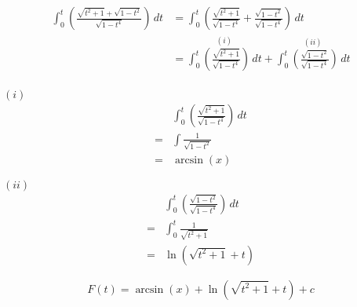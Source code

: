 \documentclass{article}
\begin{document}
\begin{enumerate}[a)]
  \begin{align*}
    \int_0^t \left( \frac{\sqrt{t^2 + 1} + \sqrt{1 - t^2}}{\sqrt{1 - t^4}}\right) \,dt
    &= \int_0^t \left( \frac{\sqrt{t^2 + 1}}{\sqrt{1 - t^4}} + \frac{\sqrt{1 - t^2}}{\sqrt{1 - t^4}}\right) \,dt \\
    &= \overset{(i)}{\int_0^t \left( \frac{\sqrt{t^2 + 1}}{\sqrt{1 - t^4}}\right) \,dt} +
       \overset{(ii)}{\int_0^t \left(\frac{\sqrt{1 - t^2}}{\sqrt{1 - t^4}}\right) \,dt} \\
  \end{align*}
  \begin{minipage}[t]{.45\textwidth}
    \textbf{$(i)$}
    \begin{align*}
      &\int_0^t \left( \frac{\sqrt{t^2 + 1}}{\sqrt{1 - t^4}}\right) \,dt \\
      = & \int \frac{1}{\sqrt{1 - t^2}} \\
      = & \arcsin (x)
    \end{align*}
  \end{minipage}
  \hfill
  \begin{minipage}[t]{.45\textwidth}
    \textbf{$(ii)$}
    \begin{align*}
      &\int_0^t \left( \frac{\sqrt{1 - t^2}}{\sqrt{1 - t^4}}\right) \,dt \\
      = & \int_0^t \frac{1}{\sqrt{t^2 + 1}} \\
      = & \ln \left( \sqrt{t^2 + 1} + t\right)
    \end{align*}
  \end{minipage}
  \[
    F(t) = \arcsin (x) + \ln \left( \sqrt{t^2 + 1} + t\right) + c
  \]
\end{enumerate}
\end{document}
